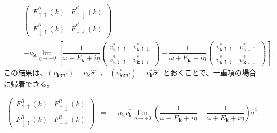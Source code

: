 \documentclass[uplatex,a4j,12pt,dvipdfmx]{jsarticle}
\begin{document}
\begin{eqnarray}
	&&
	\left(
	\begin{array}{cc}
			\bar{F}_{\uparrow \uparrow}^{R}(k)   & \bar{F}_{\uparrow \downarrow}^{R}(k)   \\[3mm]
			\bar{F}_{\downarrow \uparrow}^{R}(k) & \bar{F}_{\downarrow \downarrow}^{R}(k)
		\end{array}
	\right)
	\nonumber \\[4mm] &=&
	-
	u_{ \bm{k} }
	\lim_{\eta \to +0}
	\left[
		\dfrac{ 1 }{ \omega - E_{\bm{k}} + i \eta }
		\left(
		\begin{array}{cc}
				v_{\bm{k} \uparrow \uparrow}^{*}
				 &
				v_{\bm{k} \uparrow \downarrow}^{*}
				\\[3mm]
				v_{\bm{k} \downarrow \uparrow}^{*}
				 &
				v_{\bm{k} \downarrow \downarrow}^{*}
			\end{array}
		\right)
		-
		\dfrac{ 1 }{ \omega + E_{\bm{k}} + i \eta }
		\left(
		\begin{array}{cc}
				v_{\bm{k} \uparrow \uparrow}^{*}
				 &
				v_{\bm{k} \downarrow \uparrow}^{*}
				\\[3mm]
				v_{\bm{k} \uparrow \downarrow}^{*}
				 &
				v_{\bm{k} \downarrow \downarrow}^{*}
			\end{array}
		\right)
		\right]
	.
\end{eqnarray}
%
この結果は、$(v_{\bm{k} \sigma \sigma'}) = v_{\bm{k}} \hat{\sigma}^{x}$
、
$(v_{\bm{k} \sigma \sigma'}^{*}) = v_{\bm{k}}^{*} \hat{\sigma}^{x}$
とおくことで、一重項の場合に帰着できる。

\begin{eqnarray}
	\left(
	\begin{array}{cc}
			F_{\uparrow \uparrow}^{R}(k)   & F_{\uparrow \downarrow}^{R}(k)   \\[3mm]
			F_{\downarrow \uparrow}^{R}(k) & F_{\downarrow \downarrow}^{R}(k)
		\end{array}
	\right)
	&=&
	-
	u_{ \bm{k} }
	v_{ \bm{k} }^{*}
	\lim_{\eta \to +0}
	\left(
	\dfrac{ 1 }{ \omega - E_{\bm{k}} + i \eta }
	-
	\dfrac{ 1 }{ \omega + E_{\bm{k}} + i \eta }
	\right)
	\hat{\sigma}^{x}
	.
\end{eqnarray}
\end{document}
